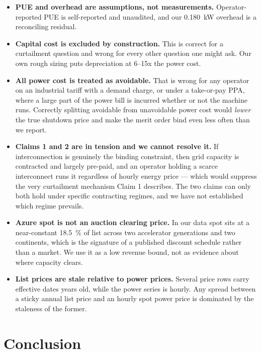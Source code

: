 \documentclass[11pt]{article}
\begin{document}
\begin{itemize}
    hundredfold gap.
  \item \textbf{PUE and overhead are assumptions, not measurements.}
    Operator-reported PUE is self-reported and unaudited, and our
    \SI{0.180}{\kilo\watt} overhead is a reconciling residual.
  \item \textbf{Capital cost is excluded by construction.} This is correct
    for a curtailment question and wrong for every other question one might
    ask. Our own rough sizing puts depreciation at \numrange{6}{15}x the
    power cost.
  \item \textbf{All power cost is treated as avoidable.} That is wrong for
    any operator on an industrial tariff with a demand charge, or under a
    take-or-pay PPA, where a large part of the power bill is incurred
    whether or not the machine runs. Correctly splitting avoidable from
    unavoidable power cost would \emph{lower} the true shutdown price and
    make the merit order bind even less often than we report.
  \item \textbf{Claims 1 and 2 are in tension and we cannot resolve it.} If
    interconnection is genuinely the binding constraint, then grid capacity
    is contracted and largely pre-paid, and an operator holding a scarce
    interconnect runs it regardless of hourly energy price --- which would
    suppress the very curtailment mechanism Claim 1 describes. The two
    claims can only both hold under specific contracting regimes, and we
    have not established which regime prevails.
  \item \textbf{Azure spot is not an auction clearing price.} In our data
    spot sits at a near-constant \SI{18.5}{\percent} of list across two
    accelerator generations and two continents, which is the signature of a
    published discount schedule rather than a market. We use it as a low
    revenue bound, not as evidence about where capacity clears.
  \item \textbf{List prices are stale relative to power prices.} Several
    price rows carry effective dates years old, while the power series is
    hourly. Any spread between a sticky annual list price and an hourly
    spot power price is dominated by the staleness of the former.
\end{itemize}

\section{Conclusion}
\label{sec:conclusion}
\end{document}
